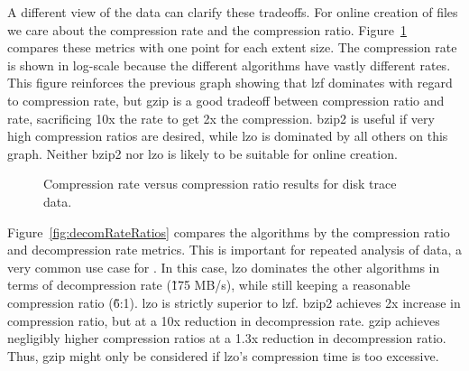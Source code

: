A different view of the data can clarify these tradeoffs.
For online creation of \DataSeries{} files we care about the compression
rate and the compression ratio.
Figure~\ref{fig:comRateRatios} compares these metrics
with one point for each extent size.  The compression rate is shown
in log-scale because the different algorithms have vastly different rates.
This figure reinforces the previous graph showing that lzf dominates
with regard to compression rate, but gzip is a good tradeoff between
compression ratio and rate, sacrificing 10x the rate to get 2x
the compression.  bzip2 is useful if very high compression
ratios are desired, while lzo is dominated by all others on this graph.
Neither bzip2 nor lzo is likely to be suitable for online creation.


\begin{figure}[tbh]
\caption{ Compression rate versus compression ratio results for disk trace data.}
\label{fig:comRateRatios}
\end{figure}

Figure~\ref{fig:decomRateRatios} compares the algorithms by the
compression ratio and decompression rate metrics.  This is important
for repeated analysis of data, a very common use case for
\DataSeries{}.  In this case, lzo dominates the other algorithms in
terms of decompression rate (\~175 MB/s), while still keeping a
reasonable compression ratio (\~6:1). lzo is strictly superior to lzf.
bzip2 achieves 
2x increase in compression ratio, but at a 
10x
reduction in decompression rate.  gzip achieves negligibly higher
compression ratios at a 
1.3x reduction in decompression ratio.
Thus, gzip might only be considered if
lzo's compression time is too excessive.

